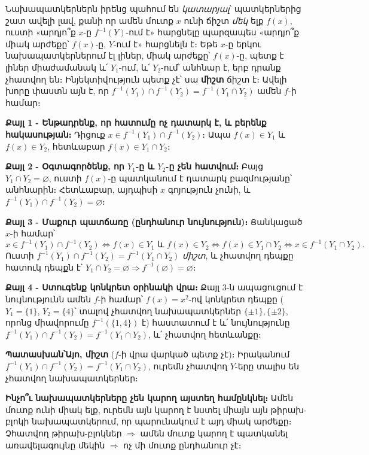 \documentclass[11pt,a4paper]{article}
\newcommand{\answer}[1]{\begin{answerbox}\centering\textbf{Պատասխան՝}\quad #1\end{answerbox}}
\begin{document}
\begin{ideabox}
Նախապատկերներն իրենց պահում են \emph{կատարյալ}՝ պատկերներից շատ ավելի լավ, քանի որ ամեն մուտք $x$ ունի
ճիշտ \emph{մեկ} ելք $f(x)$, ուստի «արդյո՞ք $x$-ը $f^{-1}(Y)$-ում է» հարցնելը պարզապես «արդյո՞ք
միակ արժեքը՝ $f(x)$-ը, $Y$-ում է» հարցնելն է։ Եթե $x$-ը երկու նախապատկերներում էլ լիներ, միակ արժեքը՝
$f(x)$-ը, պետք է լիներ միաժամանակ և՛ $Y_1$-ում, և՛ $Y_2$-ում՝ անհնար է, երբ դրանք չհատվող
են։ Ինյեկտիվություն պետք չէ՝ սա \textbf{միշտ} ճիշտ է։ Ավելի խորը փաստն այն է, որ
$f^{-1}(Y_1)\cap f^{-1}(Y_2)=f^{-1}(Y_1\cap Y_2)$ ամեն $f$-ի համար։
\end{ideabox}

\textbf{Քայլ 1 - Ենթադրենք, որ հատումը ոչ դատարկ է, և բերենք հակասության։} Դիցուք
$x\in f^{-1}(Y_1)\cap f^{-1}(Y_2)$։ Ապա $f(x)\in Y_1$ և $f(x)\in Y_2$, հետևաբար
$f(x)\in Y_1\cap Y_2$։

\textbf{Քայլ 2 - Օգտագործենք, որ $Y_1$-ը և $Y_2$-ը չեն հատվում։} Բայց $Y_1\cap Y_2=\varnothing$, ուստի $f(x)$-ը պատկանում է
դատարկ բազմությանը՝ անհնարին։ Հետևաբար, այդպիսի $x$ գոյություն չունի, և
$f^{-1}(Y_1)\cap f^{-1}(Y_2)=\varnothing$։

\textbf{Քայլ 3 - Մաքուր պատճառը (ընդհանուր նույնություն)։} Ցանկացած $x$-ի համար՝
\[
x\in f^{-1}(Y_1)\cap f^{-1}(Y_2)
\iff f(x)\in Y_1 \text{ և } f(x)\in Y_2
\iff f(x)\in Y_1\cap Y_2
\iff x\in f^{-1}(Y_1\cap Y_2).
\]
Ուստի $f^{-1}(Y_1)\cap f^{-1}(Y_2)=f^{-1}(Y_1\cap Y_2)$ \emph{միշտ}, և չհատվող դեպքը
հատուկ դեպքն է՝ $Y_1\cap Y_2=\varnothing\Rightarrow f^{-1}(\varnothing)=\varnothing$։

\textbf{Քայլ 4 - Ստուգենք կոնկրետ օրինակի վրա։} Քայլ 3-ն ապացուցում է նույնությունն ամեն $f$-ի
համար՝ $f(x)=x^2$-ով կոնկրետ դեպքը ($Y_1=\{1\}$, $Y_2=\{4\}$՝ տալով չհատվող նախապատկերներ
$\{\pm1\},\{\pm2\}$, որոնց միավորումը $f^{-1}(\{1,4\})$ է) հաստատում է և՛ նույնությունը
$f^{-1}(Y_1)\cap f^{-1}(Y_2)=f^{-1}(Y_1\cap Y_2)$, և՛ չհատվող հետևանքը։

\answer{\textbf{Այո, միշտ} ($f$-ի վրա վարկած պետք չէ)։ Իրականում
$f^{-1}(Y_1)\cap f^{-1}(Y_2)=f^{-1}(Y_1\cap Y_2)$, ուրեմն չհատվող $Y$-երը տալիս են չհատվող նախապատկերներ։}

\medskip
\textbf{Ինչո՞ւ նախապատկերները չեն կարող այստեղ համընկնել։} Ամեն մուտք ունի միակ ելք, ուրեմն այն կարող է
նստել միայն այն թիրախ-բլոկի նախապատկերում, որ պարունակում է այդ միակ արժեքը։ Չհատվող թիրախ-բլոկներ
$\Rightarrow$ ամեն մուտք կարող է պատկանել առավելագույնը մեկին $\Rightarrow$ ոչ մի մուտք ընդհանուր չէ։
\end{document}
